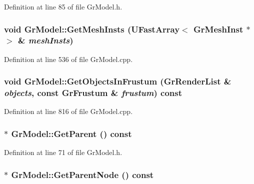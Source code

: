 Definition at line 85 of file GrModel.h.\hypertarget{class_gr_model_0b9f56be2def3c655a5a37ed425539c4}{
\subsubsection[{GetMeshInsts}]{\setlength{\rightskip}{0pt plus 5cm}void GrModel::GetMeshInsts ({\bf UFastArray}$<$ {\bf GrMeshInst} $\ast$ $>$ \& {\em meshInsts})}}
\label{class_gr_model_0b9f56be2def3c655a5a37ed425539c4}




Definition at line 536 of file GrModel.cpp.\hypertarget{class_gr_model_d152158878fd8ee7d0f4f07915c54d01}{
\subsubsection[{GetObjectsInFrustum}]{\setlength{\rightskip}{0pt plus 5cm}void GrModel::GetObjectsInFrustum ({\bf GrRenderList} \& {\em objects}, \/  const {\bf GrFrustum} \& {\em frustum}) const}}
\label{class_gr_model_d152158878fd8ee7d0f4f07915c54d01}




Definition at line 816 of file GrModel.cpp.\hypertarget{class_gr_model_ad017a6434f66a1051a57920b0561098}{
\subsubsection[{GetParent}]{$\ast$ GrModel::GetParent () const}}
\label{class_gr_model_ad017a6434f66a1051a57920b0561098}




Definition at line 71 of file GrModel.h.\hypertarget{class_gr_model_3497944f601c7427a96f66cafc3a151e}{
\subsubsection[{GetParentNode}]{$\ast$ GrModel::GetParentNode () const}}
\label{class_gr_model_3497944f601c7427a96f66cafc3a151e}




